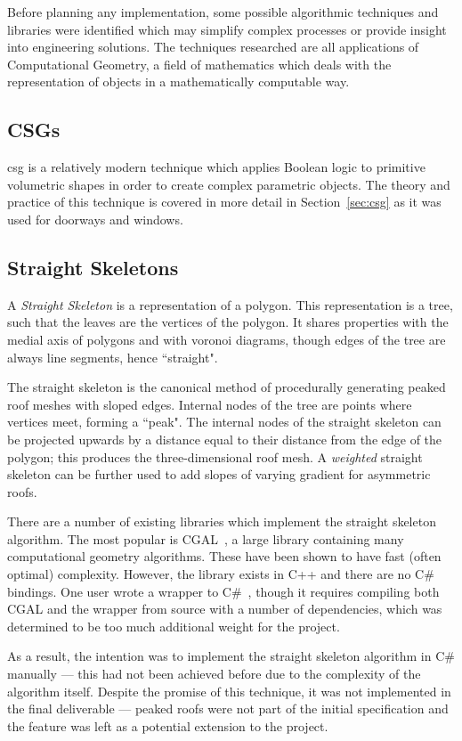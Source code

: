     Before planning any implementation, some possible algorithmic techniques and libraries were identified which may simplify complex processes or provide insight into engineering solutions. The techniques researched are all applications of Computational Geometry, a field of mathematics which deals with the representation of objects in a mathematically computable way.

\subsection*{CSGs}
    
    \acrfull{csg} is a relatively modern technique which applies Boolean logic to primitive volumetric shapes in order to create complex parametric objects. The theory and practice of this technique is covered in more detail in Section~\ref{sec:csg} as it was used for doorways and windows. 
    
\subsection*{Straight Skeletons}
    
    A \textit{Straight Skeleton} is a representation of a polygon. This representation is a tree, such that the leaves are the vertices of the polygon. It shares properties with the medial axis of polygons and with voronoi diagrams, though edges of the tree are always line segments, hence ``straight". 
    
    The straight skeleton is the canonical method of procedurally generating peaked roof meshes with sloped edges. Internal nodes of the tree are points where vertices meet, forming a ``peak". The internal nodes of the straight skeleton can be projected upwards by a distance equal to their distance from the edge of the polygon; this produces the three-dimensional roof mesh. A \textit{weighted} straight skeleton can be further used to add slopes of varying gradient for asymmetric roofs. 
    
    There are a number of existing libraries which implement the straight skeleton algorithm. The most popular is CGAL~\cite{cgal}, a large library containing many computational geometry algorithms. These have been shown to have fast (often optimal) complexity. However, the library exists in C++ and there are no C\# bindings. One user wrote a wrapper to C\#~\cite{cgalwrap}, though it requires compiling both CGAL and the wrapper from source with a number of dependencies, which was determined to be too much additional weight for the project.
    
    As a result, the intention was to implement the straight skeleton algorithm in C\# manually --- this had not been achieved before due to the complexity of the algorithm itself. Despite the promise of this technique, it was not implemented in the final deliverable --- peaked roofs were not part of the initial specification and the feature was left as a potential extension to the project.